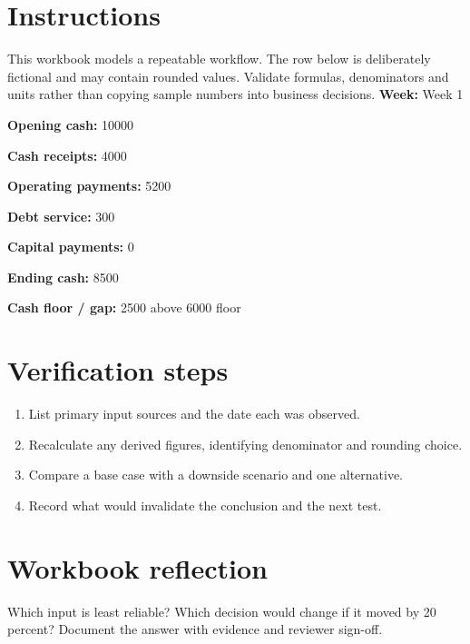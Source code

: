 \documentclass[11pt]{article}
\begin{document}
\SuiteOpen
\section{Instructions}
This workbook models a repeatable workflow. The row below is deliberately fictional and may contain rounded values. Validate formulas, denominators and units rather than copying sample numbers into business decisions.
\noindent\textbf{Week:} Week 1\par\medskip
\noindent\textbf{Opening cash:} 10000\par\medskip
\noindent\textbf{Cash receipts:} 4000\par\medskip
\noindent\textbf{Operating payments:} 5200\par\medskip
\noindent\textbf{Debt service:} 300\par\medskip
\noindent\textbf{Capital payments:} 0\par\medskip
\noindent\textbf{Ending cash:} 8500\par\medskip
\noindent\textbf{Cash floor / gap:} 2500 above 6000 floor\par\medskip
\section{Verification steps}
\begin{enumerate}[leftmargin=*,itemsep=5pt]
\item List primary input sources and the date each was observed.
\item Recalculate any derived figures, identifying denominator and rounding choice.
\item Compare a base case with a downside scenario and one alternative.
\item Record what would invalidate the conclusion and the next test.
\end{enumerate}

\section{Workbook reflection}
Which input is least reliable? Which decision would change if it moved by 20 percent? Document the answer with evidence and reviewer sign-off.
\end{document}
